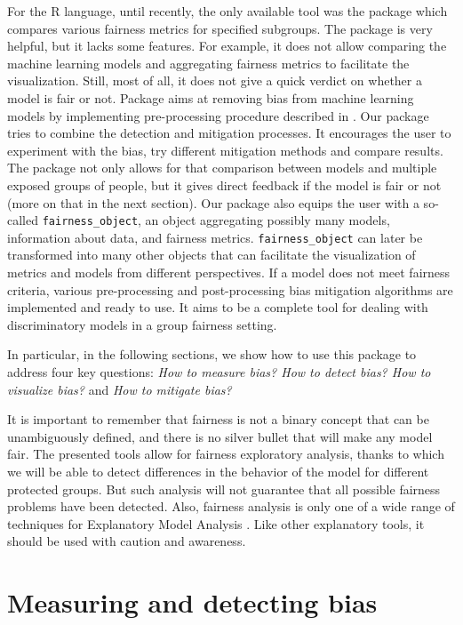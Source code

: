 For the R language, until recently, the only available tool was the
 \citep{fairness} package which compares various
fairness metrics for specified subgroups. The  package is
very helpful, but it lacks some features. For example, it does not allow
comparing the machine learning models and aggregating fairness metrics
to facilitate the visualization. Still, most of all, it does not give a
quick verdict on whether a model is fair or not. Package
 aims at removing bias from machine learning models
by implementing pre-processing procedure described in
\citet{plecko2019fair}. Our package tries to combine the detection and
mitigation processes. It encourages the user to experiment with the
bias, try different mitigation methods and compare results. The package
 not only allows for that comparison between models and
multiple exposed groups of people, but it gives direct feedback if the
model is fair or not (more on that in the next section). Our package
also equips the user with a so-called \texttt{fairness\_object}, an
object aggregating possibly many models, information about data, and
fairness metrics. \texttt{fairness\_object} can later be transformed
into many other objects that can facilitate the visualization of metrics
and models from different perspectives. If a model does not meet
fairness criteria, various pre-processing and post-processing bias
mitigation algorithms are implemented and ready to use. It aims to be a
complete tool for dealing with discriminatory models in a group fairness
setting.

In particular, in the following sections, we show how to use this
package to address four key questions: \emph{How to measure bias? How to
detect bias? How to visualize bias?} and \emph{How to mitigate bias?}

It is important to remember that fairness is not a binary concept that
can be unambiguously defined, and there is no silver bullet that will
make any model fair. The presented tools allow for fairness exploratory
analysis, thanks to which we will be able to detect differences in the
behavior of the model for different protected groups. But such analysis
will not guarantee that all possible fairness problems have been
detected. Also, fairness analysis is only one of a wide range of
techniques for Explanatory Model Analysis \citep{ema2021}. Like other
explanatory tools, it should be used with caution and awareness.

\hypertarget{measuring-and-detecting-bias}{%
\section{Measuring and detecting
bias}\label{measuring-and-detecting-bias}}

